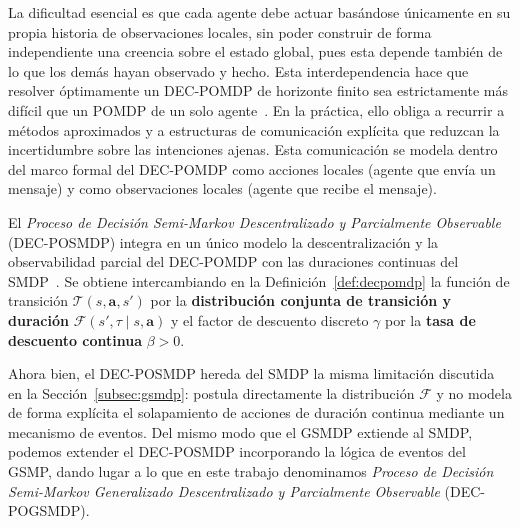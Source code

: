 La dificultad esencial es que cada agente debe actuar basándose únicamente en su propia historia de observaciones locales, sin poder construir de forma independiente una creencia sobre el estado global, pues esta depende también de lo que los demás hayan observado y hecho. Esta interdependencia hace que resolver óptimamente un DEC-POMDP de horizonte finito sea estrictamente más difícil que un POMDP de un solo agente~\cite{bernstein2002complexity}. En la práctica, ello obliga a recurrir a métodos aproximados y a estructuras de comunicación explícita que reduzcan la incertidumbre sobre las intenciones ajenas. Esta comunicación se modela dentro del marco formal del DEC-POMDP como acciones locales (agente que envía un mensaje) y como observaciones locales (agente que recibe el mensaje).

El \emph{Proceso de Decisión Semi-Markov Descentralizado y Parcialmente Observable} (DEC-POSMDP) integra en un único modelo la descentralización y la observabilidad parcial del DEC-POMDP con las duraciones continuas del SMDP~\cite{omidshafiei2017decentralized}. Se obtiene intercambiando en la Definición~\ref{def:decpomdp} la función de transición $\mathcal{T}(s,\mathbf{a},s')$ por la \textbf{distribución conjunta de transición y duración} $\mathcal{F}(s',\tau\mid s,\mathbf{a})$ y el factor de descuento discreto $\gamma$ por la \textbf{tasa de descuento continua} $\beta > 0$.
 
Ahora bien, el DEC-POSMDP hereda del SMDP la misma limitación discutida en la Sección~\ref{subsec:gsmdp}: postula directamente la distribución $\mathcal{F}$ y no modela de forma explícita el solapamiento de acciones de duración continua mediante un mecanismo de eventos. Del mismo modo que el GSMDP extiende al SMDP, podemos extender el DEC-POSMDP incorporando la lógica de eventos del GSMP, dando lugar a lo que en este trabajo denominamos \emph{Proceso de Decisión Semi-Markov Generalizado Descentralizado y Parcialmente Observable} (DEC-POGSMDP).
 
